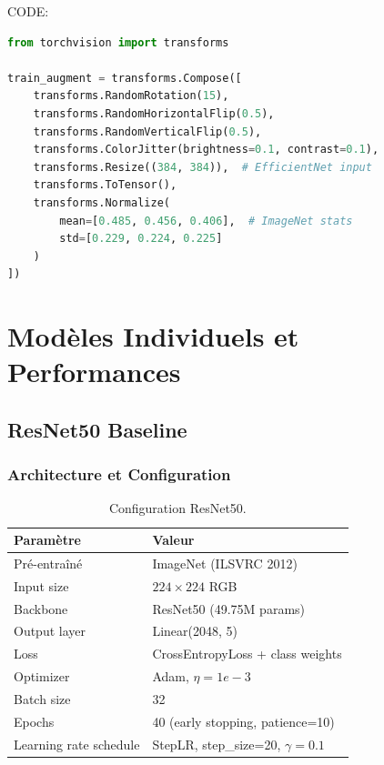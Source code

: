 \documentclass[12pt,a4paper,oneside]{report}
\begin{document}
CODE:
\begin{lstlisting}[language=Python, caption=Data augmentation pipeline]
from torchvision import transforms

train_augment = transforms.Compose([
    transforms.RandomRotation(15),
    transforms.RandomHorizontalFlip(0.5),
    transforms.RandomVerticalFlip(0.5),
    transforms.ColorJitter(brightness=0.1, contrast=0.1),
    transforms.Resize((384, 384)),  # EfficientNet input
    transforms.ToTensor(),
    transforms.Normalize(
        mean=[0.485, 0.456, 0.406],  # ImageNet stats
        std=[0.229, 0.224, 0.225]
    )
])
\end{lstlisting}

\newpage


\chapter{Modèles Individuels et Performances}

\section{ResNet50 Baseline}

\subsection{Architecture et Configuration}

\begin{table}[H]
\centering
\begin{tabular}{|l|l|}
\hline
\textbf{Paramètre} & \textbf{Valeur} \\
\hline
Pré-entraîné & ImageNet (ILSVRC 2012) \\
Input size & $224 \times 224$ RGB \\
Backbone & ResNet50 (49.75M params) \\
Output layer & Linear(2048, 5) \\
Loss & CrossEntropyLoss + class weights \\
Optimizer & Adam, $\eta = 1e-3$ \\
Batch size & 32 \\
Epochs & 40 (early stopping, patience=10) \\
Learning rate schedule & StepLR, step\_size=20, $\gamma=0.1$ \\
\hline
\end{tabular}
\caption{Configuration ResNet50.}
\label{tab:resnet_config}
\end{table}
\end{document}
